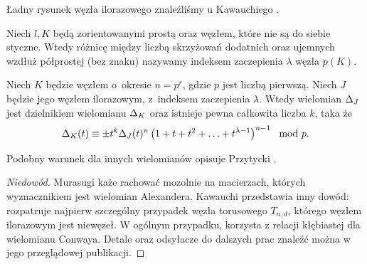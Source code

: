 Ładny rysunek węzła ilorazowego znaleźliśmy u Kawauchiego \cite[s. 122]{kawauchi1996}.

\begin{definition}
    Niech $l, K$ będą zorientowanymi prostą oraz węzłem, które nie są do siebie styczne.
    Wtedy różnicę między liczbą skrzyżowań dodatnich oraz ujemnych wzdłuż półprostej (bez znaku) nazywamy indeksem zaczepienia $\lambda$ węzła $p(K)$.
\end{definition}

\begin{proposition}
%
\label{prp:murasugi_periodic}%
    Niech $K$ będzie węzłem o~okresie $n = p^r$, gdzie $p$ jest liczbą pierwszą.
    Niech $J$ będzie jego węzłem ilorazowym, z~indeksem zaczepienia $\lambda$.
    Wtedy wielomian $\Delta_J$ jest dzielnikiem wielomianu $\Delta_K$ oraz istnieje pewna całkowita liczba $k$, taka że
    \begin{equation}
        \Delta_K(t) \equiv \pm t^k \Delta_J(t)^n \left(1 + t + t^2 + \ldots + t^{\lambda - 1}\right)^{n-1} \mod p.
    \end{equation}
\end{proposition}

Podobny warunek dla innych wielomianów opisuje Przytycki \cite[s. 168]{przytycki1995}.

\begin{proof}[Niedowód]
    Murasugi \cite{murasugi1971} każe rachować mozolnie na macierzach, których wyznacznikiem jest wielomian Alexandera.
    Kawauchi \cite[s. 122-124]{kawauchi1996} przedstawia inny dowód: rozpatruje najpierw szczególny przypadek węzła torusowego $T_{n, d}$, którego węzłem ilorazowym jest niewęzeł.
    W ogólnym przypadku, korzysta z relacji kłębiastej dla wielomianu Conwaya.
    Detale oraz odsyłacze do dalszych prac znaleźć można w jego przeglądowej publikacji.
\end{proof}

